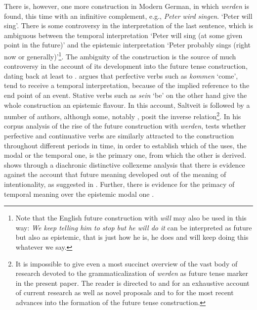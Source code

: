 \documentclass[output=paper,colorlinks,citecolor=brown]{langscibook}
\begin{document}
There is, however, one more construction in Modern German, in which \textit{werden} is found, this time with an infinitive complement, e.g., \textit{Peter wird singen}. ‘Peter will sing’. There is some controversy in the interpretation of the last sentence, which is ambiguous between the temporal interpretation ‘Peter will sing (at some given point in the future)’ and the epistemic interpretation ‘Peter probably sings (right now or generally)’\footnote{Note that the English future construction with \textit{will} may also be used in this way: \textit{We keep telling him to stop but he will do it} can be interpreted as future but also as epistemic, that is just how he is, he does and will keep doing this whatever we say.}. The ambiguity of the construction is the source of much controversy in the account of its development into the future tense construction, dating back at least to \citet[]{Saltveit1962}. \citet[175]{Saltveit1962} argues that perfective verbs such as \textit{kommen} ‘come’, tend to receive a temporal interpretation, because of the implied reference to the end point of an event. Stative verbs such as \textit{sein} ‘be’ on the other hand give the whole construction an epistemic flavour. In this account, Saltveit is followed by a number of authors, although some, notably \citet[196]{Leiss1992}, posit the inverse relation\footnote{It is impossible to give even a most succinct overview of the vast body of research devoted to the grammaticalization of \textit{werden} as future tense marker in the present paper. The reader is directed to \citet[]{Hilpert2008} and \citet{Osterkamp2013} for an exhaustive account of current research as well as novel proposals and to \citet[]{Hartmann2021} for the most recent advances into the formation of the future tense construction. }. In his corpus analysis of the rise of the future construction with \textit{werden}, \citet[133--156]{Hilpert2008} tests whether perfective and continuative verbs are similarly attracted to the construction throughout different periods in time, in order to establish which of the uses, the modal or the temporal one, is the primary one, from which the other is derived. \citet[]{Hilpert2008} shows through a diachronic distinctive collexeme analysis that there is evidence against the account that future meaning developed out of the meaning of intentionality, as suggested in \citet[]{Heine1995}. Further, there is evidence for the primacy of temporal meaning over the epistemic modal one \citep[155]{Hilpert2008}. 
\end{document}
